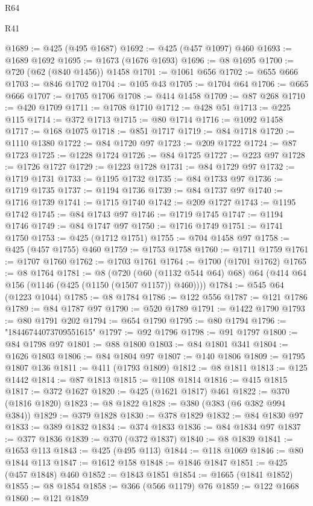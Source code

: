 \begin{lexlean}{R64}
\begin{lexlean}{R41}
\begin{coremodule}
{{{{{{{{{{{{{{{{{{{{{{{{{{{{{{{{{{{{{{{{{{{{{{{{{{{{{{{{{{{{{{{{{{{{{{{{{{{{{{{{{{{{{{{{{@1689 := @425 (@495 @1687)
@1692 := @425 (@457 @1097) @460
@1693 := @1689 @1692
@1695 := @1673 (@1676 @1693)
@1696 := @8 @1695
@1700 := @720 (@62 (@840 @1456)) @1458
@1701 := @1061 @656
@1702 := @655 @666
@1703 := @846 @1702
@1704 := @105 @43
@1705 := @1704 @64
@1706 := @665 @666
@1707 := @1705 @1706
@1708 := @414 @1458
@1709 := @87 @268
@1710 := @420 @1709
@1711 := @1708 @1710
@1712 := @428 @51
@1713 := @225 @115
@1714 := @372 @1713
@1715 := @80 @1714
@1716 := @1092 @1458
@1717 := @168 @1075
@1718 := @851 @1717
@1719 := @84 @1718
@1720 := @1110 @1380
@1722 := @84 @1720 @97
@1723 := @209 @1722
@1724 := @87 @1723
@1725 := @1228 @1724
@1726 := @84 @1725
@1727 := @223 @97
@1728 := @1726 @1727
@1729 := @1223 @1728
@1731 := @84 @1729 @97
@1732 := @1719 @1731
@1733 := @1195 @1732
@1735 := @84 @1733 @97
@1736 := @1719 @1735
@1737 := @1194 @1736
@1739 := @84 @1737 @97
@1740 := @1716 @1739
@1741 := @1715 @1740
@1742 := @209 @1727
@1743 := @1195 @1742
@1745 := @84 @1743 @97
@1746 := @1719 @1745
@1747 := @1194 @1746
@1749 := @84 @1747 @97
@1750 := @1716 @1749
@1751 := @1741 @1750
@1753 := @425 (@1712 @1751)
@1755 := @704 @1458 @97
@1758 := @425 (@457 @1755) @460
@1759 := @1753 @1758
@1760 := @1711 @1759
@1761 := @1707 @1760
@1762 := @1703 @1761
@1764 := @1700 (@1701 @1762)
@1765 := @8 @1764
@1781 := @8
    (@720 (@60 (@1132 @544 @64) @68) @64 (@414 @64 @156 (@1146 (@425 (@1150 (@1507 @1157)) @460))))
@1784 := @545 @64 (@1223 @1044)
@1785 := @8 @1784
@1786 := @122 @556
@1787 := @121 @1786
@1789 := @84 @1787 @97
@1790 := @520 @1789
@1791 := @1422 @1790
@1793 := @80 @1791 @202
@1794 := @654 @1790
@1795 := @80 @1794
@1796 := "18446744073709551615"
@1797 := @92 @1796
@1798 := @91 @1797
@1800 := @84 @1798 @97
@1801 := @88 @1800
@1803 := @84 @1801 @341
@1804 := @1626 @1803
@1806 := @84 @1804 @97
@1807 := @140 @1806
@1809 := @1795 @1807 @136
@1811 := @411 (@1793 @1809)
@1812 := @8 @1811
@1813 := @125 @1442
@1814 := @87 @1813
@1815 := @1108 @1814
@1816 := @415 @1815
@1817 := @372 @1627
@1820 := @425 (@1621 @1817) @461
@1822 := @370 (@1816 @1820)
@1823 := @8 @1822
@1828 := @380 (@383 (@6 @382 @994 @384))
@1829 := @379 @1828
@1830 := @378 @1829
@1832 := @84 @1830 @97
@1833 := @389 @1832
@1834 := @374 @1833
@1836 := @84 @1834 @97
@1837 := @377 @1836
@1839 := @370 (@372 @1837)
@1840 := @8 @1839
@1841 := @1653 @113
@1843 := @425 (@495 @113)
@1844 := @118 @1069
@1846 := @80 @1844 @113
@1847 := @1612 @158
@1848 := @1846 @1847
@1851 := @425 (@457 @1848) @460
@1852 := @1843 @1851
@1854 := @1665 (@1841 @1852)
@1855 := @8 @1854
@1858 := @366 (@566 @1179) @76
@1859 := @122 @1668
@1860 := @121 @1859
}}}}}}}}}}}}}}}}}}}}}}}}}}}}}}}}}}}}}}}}}}}}}}}}}}}}}}}}}}}}}}}}}}}}}}}}}}}}}}}}}}}}}}}}}
\end{coremodule}
\end{lexlean}
\end{lexlean}
